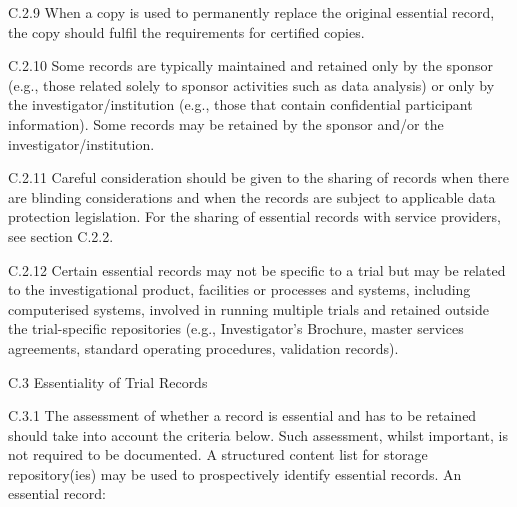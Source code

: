 \documentclass[11pt]{article}
\begin{document}
C.2.9 When a copy is used to permanently replace the original essential record, the copy should fulfil the requirements for certified copies.


C.2.10 Some records are typically maintained and retained only by the sponsor (e.g., those related solely to sponsor activities such as data analysis) or only by the investigator/institution (e.g., those that contain confidential participant information). Some records may be retained by the sponsor and/or the investigator/institution.


C.2.11 Careful consideration should be given to the sharing of records when there are blinding considerations and when the records are subject to applicable data protection legislation. For the sharing of essential records with service providers, see section C.2.2.


C.2.12 Certain essential records may not be specific to a trial but may be related to the investigational product, facilities or processes and systems, including computerised systems, involved in running multiple trials and retained outside the trial-specific repositories (e.g., Investigator's Brochure, master services agreements, standard operating procedures, validation records).


C.3 Essentiality of Trial Records


C.3.1 The assessment of whether a record is essential and has to be retained should take into account the criteria below. Such assessment, whilst important, is not required to be documented. A structured content list for storage repository(ies) may be used to prospectively identify essential records. An essential record:
\end{document}
